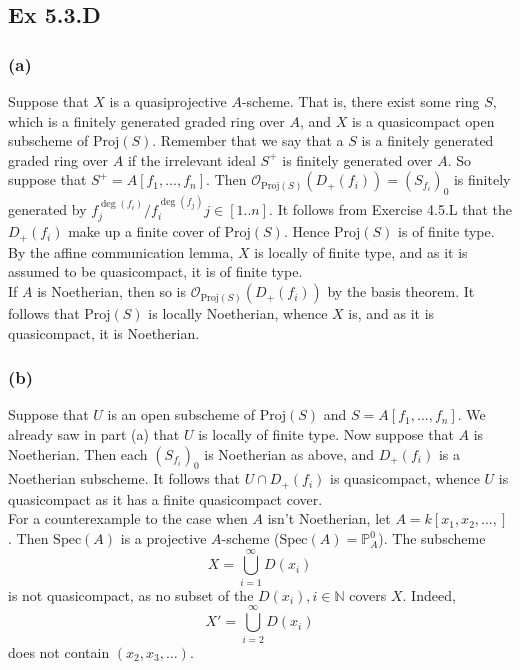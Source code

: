 \documentclass{article}
\theoremstyle{definition}
\renewcommand{\P}{\mathbb{P}}
\newcommand{\N}{\mathbb{N}}
\newcommand{\oo}{\mathcal{O}}
\newcommand{\Spec}{\text{Spec}}
\newcommand{\Proj}{\text{Proj}}
\begin{document}
\subsection*{Ex 5.3.D}

\subsubsection*{(a)}

Suppose that $X$ is a quasiprojective $A$-scheme. That is, there exist some
ring $S$, which is a finitely generated graded ring over $A$, and $X$ is a
quasicompact open subscheme of $\Proj(S)$. Remember that we say that a $S$ is a
finitely generated graded ring over $A$ if the irrelevant ideal $S^{+}$ is
finitely generated over $A$. So suppose that $S^{+} = A[f_1, \ldots, f_n]$.
Then $\oo_{\Proj(S)}(D_{+}(f_i)) = (S_{f_i})_0$ is finitely generated by
$f_j^{\deg(f_i)}/f_i^{\deg(f_j)} j \in [1..n]$. It follows from Exercise 4.5.L
that the $D_{+}(f_i)$ make up a finite cover of $\Proj(S)$. Hence $\Proj(S)$ is
of finite type. By the affine communication lemma, $X$ is locally of finite
type, and as it is assumed to be quasicompact, it is of finite type. \\

If $A$ is Noetherian, then so is $\oo_{\Proj(S)}(D_{+}(f_i))$ by the basis
theorem. It follows that $\Proj(S)$ is locally Noetherian, whence $X$ is, and
as it is quasicompact, it is Noetherian.

\subsubsection*{(b)}

Suppose that $U$ is an open subscheme of $\Proj(S)$ and $S = A[f_1, \ldots,
			f_n]$. We already saw in part (a) that $U$ is locally of finite type. Now
suppose that $A$ is Noetherian. Then each $(S_{f_i})_0$ is Noetherian as above,
and $D_{+}(f_i)$ is a Noetherian subscheme. It follows that $U \cap D_{+}(f_i)$
is quasicompact, whence $U$ is quasicompact as it has a finite quasicompact
cover. \\

For a counterexample to the case when $A$ isn't Noetherian, let $A = k[x_1,
			x_2, \ldots, ]$. Then $\Spec(A)$ is a projective $A$-scheme ($\Spec(A) =
	\P^{0}_{A}$). The subscheme
\[
	X = \bigcup_{i = 1}^{\infty}D(x_i)
\]
is not quasicompact, as no subset of the $D(x_i), i \in \N$ covers $X$. Indeed,
\[
	X' = \bigcup_{i = 2}^{\infty}D(x_i)
\]
does not contain $(x_2, x_3, \ldots)$.
\end{document}
